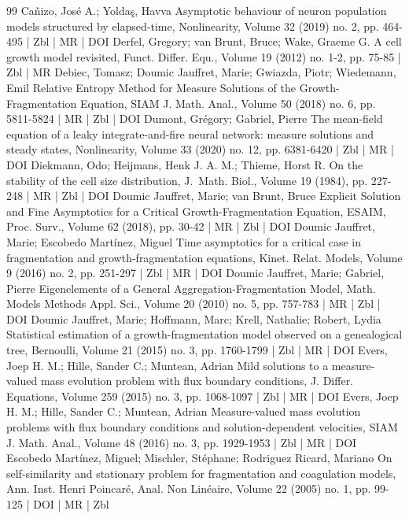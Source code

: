 \begin{thebibliography}{99}
Cañizo, José A.; Yoldaş, Havva Asymptotic behaviour of neuron population models structured by elapsed-time, Nonlinearity, Volume 32 (2019) no. 2, pp. 464-495 | Zbl | MR | DOI
Derfel, Gregory; van Brunt, Bruce; Wake, Graeme G. A cell growth model revisited, Funct. Differ. Equ., Volume 19 (2012) no. 1-2, pp. 75-85 | Zbl | MR
Debiec, Tomasz; Doumic Jauffret, Marie; Gwiazda, Piotr; Wiedemann, Emil Relative Entropy Method for Measure Solutions of the Growth-Fragmentation Equation, SIAM J. Math. Anal., Volume 50 (2018) no. 6, pp. 5811-5824 | MR | Zbl | DOI
Dumont, Grégory; Gabriel, Pierre The mean-field equation of a leaky integrate-and-fire neural network: measure solutions and steady states, Nonlinearity, Volume 33 (2020) no. 12, pp. 6381-6420 | Zbl | MR | DOI
Diekmann, Odo; Heijmans, Henk J. A. M.; Thieme, Horst R. On the stability of the cell size distribution, J. Math. Biol., Volume 19 (1984), pp. 227-248 | MR | Zbl | DOI
Doumic Jauffret, Marie; van Brunt, Bruce Explicit Solution and Fine Asymptotics for a Critical Growth-Fragmentation Equation, ESAIM, Proc. Surv., Volume 62 (2018), pp. 30-42 | MR | Zbl | DOI
Doumic Jauffret, Marie; Escobedo Martínez, Miguel Time asymptotics for a critical case in fragmentation and growth-fragmentation equations, Kinet. Relat. Models, Volume 9 (2016) no. 2, pp. 251-297 | Zbl | MR | DOI
Doumic Jauffret, Marie; Gabriel, Pierre Eigenelements of a General Aggregation-Fragmentation Model, Math. Models Methods Appl. Sci., Volume 20 (2010) no. 5, pp. 757-783 | MR | Zbl | DOI
Doumic Jauffret, Marie; Hoffmann, Marc; Krell, Nathalie; Robert, Lydia Statistical estimation of a growth-fragmentation model observed on a genealogical tree, Bernoulli, Volume 21 (2015) no. 3, pp. 1760-1799 | Zbl | MR | DOI
Evers, Joep H. M.; Hille, Sander C.; Muntean, Adrian Mild solutions to a measure-valued mass evolution problem with flux boundary conditions, J. Differ. Equations, Volume 259 (2015) no. 3, pp. 1068-1097 | Zbl | MR | DOI
Evers, Joep H. M.; Hille, Sander C.; Muntean, Adrian Measure-valued mass evolution problems with flux boundary conditions and solution-dependent velocities, SIAM J. Math. Anal., Volume 48 (2016) no. 3, pp. 1929-1953 | Zbl | MR | DOI
Escobedo Martínez, Miguel; Mischler, Stéphane; Rodriguez Ricard, Mariano On self-similarity and stationary problem for fragmentation and coagulation models, Ann. Inst. Henri Poincaré, Anal. Non Linéaire, Volume 22 (2005) no. 1, pp. 99-125 | DOI | MR | Zbl

\end{thebibliography}
